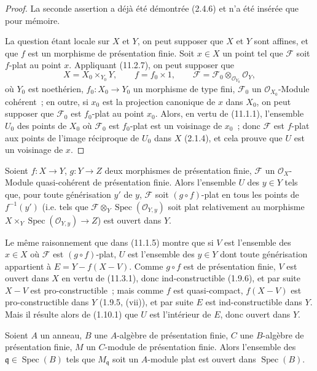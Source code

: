\begin{proof}
La seconde assertion a déjà été démontrée (2.4.6) et n'a été insérée que pour
mémoire.

La question étant locale sur $X$ et $Y$, on peut supposer que $X$ et $Y$ sont
affines, et que $f$ est un morphisme de présentation finie. Soit $x\in X$ un
point tel que $\mathcal F$ soit $f$-plat au point $x$. Appliquant (11.2.7), on
peut supposer que
\[
X=X_0\times_{Y_0}Y,\qquad f=f_0\times1,\qquad
\mathcal F=\mathcal F_0\otimes_{\mathcal O_{Y_0}}\mathcal O_Y,
\]
où $Y_0$ est noethérien, $f_0:X_0\to Y_0$ un morphisme de type fini,
$\mathcal F_0$ un $\mathcal O_{X_0}$-Module cohérent~; en outre, si $x_0$ est la
projection canonique de $x$ dans $X_0$, on peut supposer que $\mathcal F_0$ est
$f_0$-plat au point $x_0$. Alors, en vertu de (11.1.1), l'ensemble $U_0$ des
points de $X_0$ où $\mathcal F_0$ est $f_0$-plat est un voisinage de $x_0$~;
donc $\mathcal F$ est $f$-plat aux points de l'image réciproque de $U_0$ dans
$X$ (2.1.4), et cela prouve que $U$ est un voisinage de $x$.
\end{proof}


\begin{corollary}[11.3.2]
\label{IV.11.3.2-fr}
Soient $f:X\to Y$, $g:Y\to Z$ deux morphismes de présentation finie,
$\mathcal F$ un $\mathcal O_X$-Module quasi-cohérent de présentation finie.
Alors l'ensemble $U$ des $y\in Y$ tels que, pour toute générisation $y'$ de
$y$, $\mathcal F$ soit $(g\circ f)$-plat en tous les points de $f^{-1}(y')$
(i.e. tels que $\mathcal F\otimes_Y\operatorname{Spec}(\mathcal O_{Y,y})$
soit plat relativement au morphisme
$X\times_Y\operatorname{Spec}(\mathcal O_{Y,y})\to Z$) est ouvert dans $Y$.
\end{corollary}

Le même raisonnement que dans (11.1.5) montre que si $V$ est l'ensemble des
$x\in X$ où $\mathcal F$ est $(g\circ f)$-plat, $U$ est l'ensemble des $y\in Y$
dont toute générisation appartient à $E=Y-f(X-V)$. Comme $g\circ f$ est de
présentation finie, $V$ est ouvert dans $X$ en vertu de (11.3.1), donc
ind-constructible (1.9.6), et par suite $X-V$ est pro-constructible~; mais comme
$f$ est quasi-compact, $f(X-V)$ est pro-constructible dans $Y$ (1.9.5, (vii)),
et par suite $E$ est ind-constructible dans $Y$. Mais il résulte alors de
(1.10.1) que $U$ est l'intérieur de $E$, donc ouvert dans $Y$.

\begin{corollary}[11.3.3]
\label{IV.11.3.3-fr}
Soient $A$ un anneau, $B$ une $A$-algèbre de présentation finie, $C$ une
$B$-algèbre de présentation finie, $M$ un $C$-module de présentation finie.
Alors l'ensemble des $\mathfrak q\in\operatorname{Spec}(B)$ tels que
$M_\mathfrak q$ soit un $A$-module plat est ouvert dans
$\operatorname{Spec}(B)$.
\end{corollary}

